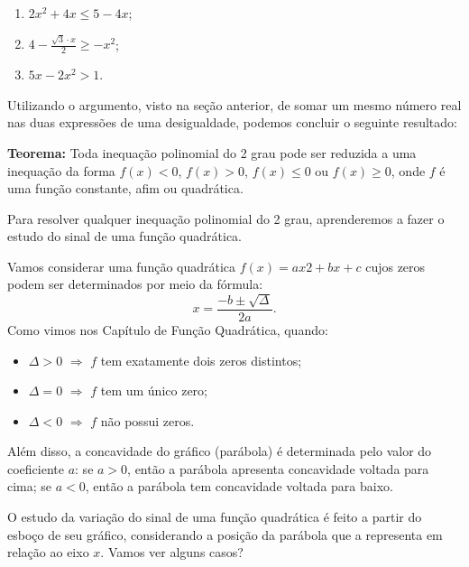 \begin{enumerate}
\item{}
$2x^2 + 4x \leq 5 - 4x$;

\item{}
$4 - \frac{\sqrt{3} \cdot x}{2} \geq -x^2$;

\item{}
$5x - 2x^2 > 1$.
\end{enumerate}

Utilizando o argumento, visto na seção anterior, de somar um mesmo número real nas duas expressões de uma desigualdade, podemos concluir o seguinte resultado:
 
\begin{observation}{}
\textbf{Teorema:} Toda inequação polinomial do 2 grau pode ser reduzida a uma inequação da forma $f(x) <0$, $f(x) > 0$, $f(x) \leq 0$ ou $f(x) \geq 0$, onde $f$ é uma função constante, afim ou quadrática.

\end{observation}

Para resolver qualquer inequação polinomial do 2 grau, aprenderemos a fazer o estudo do sinal de uma função quadrática.

Vamos considerar uma função quadrática $f(x) = ax2 + bx + c$ cujos zeros podem ser determinados por meio da fórmula:
$$
x = \frac{-b \pm \sqrt{\Delta}}{2a}.
$$  
Como vimos nos Capítulo de Função Quadrática, quando:

\begin{itemize}
\item  $\Delta >0$ $\Rightarrow$ $f$ tem exatamente dois zeros distintos;

\item   $\Delta =0$ $\Rightarrow$ $f$ tem um único zero;

\item  $\Delta <0$ $\Rightarrow$ $f$ não possui zeros.
\end{itemize}

Além disso, a concavidade do gráfico (parábola) é determinada pelo valor do coeficiente $a$: se  $a>0$, então a parábola apresenta concavidade voltada para cima; se $a<0$, então a parábola tem concavidade voltada para baixo. 


O estudo da variação do sinal de uma função quadrática é feito a partir do esboço de seu gráfico, considerando a posição da parábola que a representa em relação ao eixo $x$. Vamos ver alguns casos?


